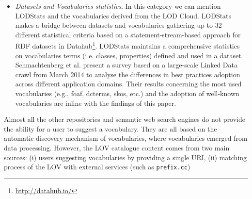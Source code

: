 \documentclass{iosart2c}
\begin{document}
\begin{itemize}
 \item \textit{Datasets and Vocabularies statistics}. In this category we can mention LODStats \cite{demter-2012-ekaw} and the vocabularies derived from the LOD Cloud.  LODStats makes a bridge between datasets and vocabularies gathering up to 32 different statistical criteria based on a statement-stream-based approach for RDF datasets in Datahub\footnote{\url{http://datahub.io/}}. LODStats maintains a comprehensive statistics on vocabularies terms (i.e. classes, properties) defined and used in a dataset. Schmachtenberg et al. \cite{max2014} present a survey based on a large-scale Linked Data crawl from March 2014 to analyse the differences in best practices adoption across different application domains. Their results concerning the most used vocabularies (e.g., foaf, dcterms, skos, etc.) and the adoption of well-known vocabularies are inline with the findings of this paper.
\end{itemize}


Almost all the other repositories and semantic web search engines do not provide the ability for a user to suggest a vocabulary. They are all based on the automatic discovery mechanism of vocabularies, where vocabularies emerged from data processing. However, the LOV catalogue content comes from two main sources: (i) users suggesting vocabularies by providing a single URI, (ii) matching process of the LOV with external services (such as \texttt{prefix.cc})
\end{document}
